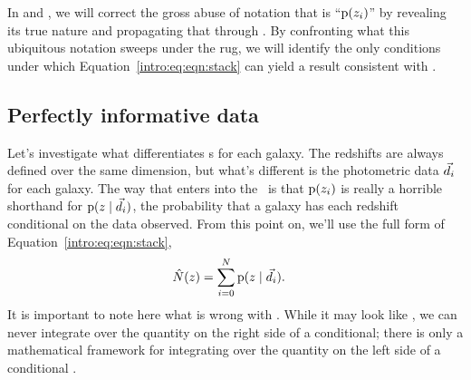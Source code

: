 In  and , we will correct the gross abuse of notation that is ``$\mathrm{p}(z_{i})$'' by revealing its true nature and propagating that through .
By confronting what this ubiquitous notation sweeps under the rug, we will identify the only conditions under which Equation~\ref{intro:eq:eqn:stack} can yield a result consistent with .

\subsection{Perfectly informative data}

Let's investigate what differentiates \pzpdf s for each galaxy.
The redshifts are always defined over the same dimension, but what's different is the photometric data $\vec{d}_{i}$ for each galaxy.
The way that enters into the \pzpdf\ is that $\mathrm{p}(z_{i})$ is really a horrible shorthand for $\mathrm{p}(z \mid \vec{d}_{i})$, the probability that a galaxy has each redshift conditional on the data observed.
From this point on, we'll use the full form of Equation~\ref{intro:eq:eqn:stack},
\begin{align}
\eqlabel{eqn:stackwithdata}
\hat{N}(z) &= \sum_{i = 0}^{N} \pr{z \gvn \data_{i}} .
\end{align}
It is important to note here what is wrong with .
While it may look like , we can never integrate over the quantity on the right side of a conditional; there is only a mathematical framework for integrating over the quantity on the left side of a conditional \citep{hogg_data_2012}.

